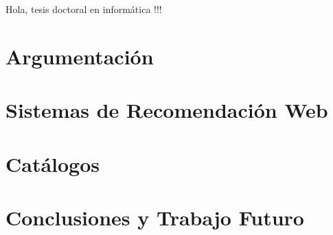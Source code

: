\documentclass[utf8]{book}
\begin{document}
Hola, tesis doctoral en informática !!!
\newpage

\tableofcontents

\chapter*{Argumentación}
\label{chap:argumentacion}





\chapter{Sistemas de Recomendación Web}
\label{chap:SRW}




\chapter{Catálogos}
\label{chap:catalogos}




\chapter{Conclusiones y Trabajo Futuro}
\label{chap:conclusiones-y-trabajo-futuro}
\end{document}
